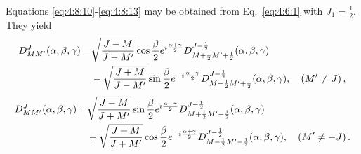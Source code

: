 Equations \eqref{eq:4:8:10}-\eqref{eq:4:8:13} may be obtained from Eq.~\eqref{eq:4:6:1} with $J_{1}=\frac{1}{2}$. They yield
\begin{align}
D_{M M^{\prime}}^{J}(\alpha, \beta, \gamma)= & \sqrt{\frac{J-M}{J-M^{\prime}}} \cos \frac{\beta}{2} e^{i \frac{\alpha+\gamma}{2}} D_{M+\frac{1}{2} M^{\prime}+\frac{1}{2}}^{J-\frac{1}{2}}(\alpha, \beta, \gamma)  \notag\\
& -\sqrt{\frac{J+M}{J-M^{\prime}}} \sin \frac{\beta}{2} e^{-i \frac{\alpha-\gamma}{2}} D_{M-\frac{1}{2} M^{\prime}+\frac{1}{2}}^{J-\frac{1}{2}}(\alpha, \beta, \gamma), \quad\left(M^{\prime} \neq J\right),  \label{eq:4:8:14}
\end{align}\begin{align}
D_{M M^{\prime}}^{J}(\alpha, \beta, \gamma)= & \sqrt{\frac{J-M}{J+M^{\prime}}} \sin \frac{\beta}{2} e^{i \frac{\alpha-\gamma}{2}} D_{M+\frac{1}{2} M^{\prime}-\frac{1}{2}}^{J-\frac{1}{2}}(\alpha, \beta, \gamma)  \notag\\
& +\sqrt{\frac{J+M}{J+M^{\prime}}} \cos \frac{\beta}{2} e^{-i \frac{\alpha+\gamma}{2}} D_{M-\frac{1}{2} M^{\prime}-\frac{1}{2}}^{J-\frac{1}{2}}(\alpha, \beta, \gamma), \quad\left(M^{\prime} \neq-J\right) . \label{eq:4:8:15}
\end{align}
